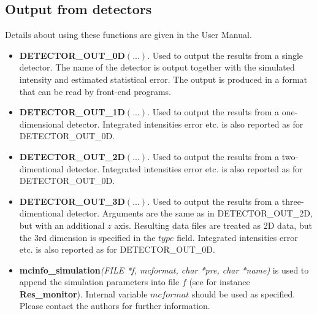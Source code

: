 \subsection{Output from detectors}
Details about using these functions are given in the \MCS User Manual.
\begin{itemize}
\item \textbf{DETECTOR\_OUT\_0D}$(...)$. Used to output the results from a
  single detector. The name of the detector is output together
  with the simulated intensity and estimated statistical error. The
  output is produced in a format that can be read by \MCS front-end
  programs.
\item \textbf{DETECTOR\_OUT\_1D}$(...)$. Used to output the results from a
  one-dimensional detector. Integrated intensities error etc. is also
  reported as for DETECTOR\_OUT\_0D.
\item \textbf{DETECTOR\_OUT\_2D}$(...)$. Used to output the results from a
  two-dimentional detector. Integrated intensities error etc. is also
  reported as for DETECTOR\_OUT\_0D.
\item \textbf{DETECTOR\_OUT\_3D}$(...)$. Used to output
  the results from a three-dimentional detector. Arguments are the same as
  in DETECTOR\_OUT\_2D, but with an additional $z$ axis.
  Resulting data files are treated as 2D data, but the 3rd dimension is
  specified in the $type$ field. Integrated intensities error etc. is also
  reported as for DETECTOR\_OUT\_0D.
\item \textbf{mcinfo\_simulation}\textit{(FILE *f, mcformat,
  char *pre, char *name)} is used to append the simulation parameters into file $f$
  (see for instance \textbf{Res\_monitor}).
  Internal variable $mcformat$ should be used as specified.
  Please contact the authors for further information.
\end{itemize}

